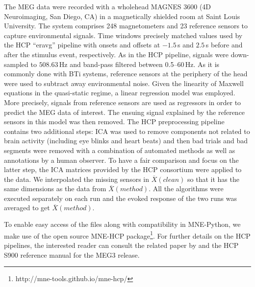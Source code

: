 The MEG data were recorded with a wholehead MAGNES 3600 (4D Neuroimaging, San Diego, CA) in a magnetically shielded room at Saint Louis University. The system comprises 248 magnetometers and 23 reference sensors to capture environmental signals. Time windows precisely matched values used by the HCP ``eravg'' pipeline with onsets and offsets at $-1.5$\,s and $2.5$\,s before and after the stimulus event, respectively. As in the HCP pipeline, signals were down-sampled to $508.63$\,Hz and band-pass filtered between 0.5--60\,Hz. As it is commonly done with BTi systems, reference sensors at the periphery of the head were used to subtract away environmental noise. Given the linearity of Maxwell equations in the quasi-static regime, a linear regression model was employed. More precisely, signals from reference sensors are used as regressors in order to predict the MEG data of interest. The ensuing signal explained by the reference sensors in this model was then removed. The HCP preprocessing pipeline contains two additional steps: ICA was used to remove components not related to brain activity (including eye blinks and heart beats) and then bad trials and bad segments were removed with a combination of automated methods as well as annotations by a human observer. To have a fair comparison and focus on the latter step, the ICA matrices provided by the HCP consortium were applied to the data. We interpolated the missing sensors in $\overbar{X}(clean)$ so that it has the same dimensions as the data from $\overbar{X}(method)$. All the algorithms were executed separately on each run and the evoked response of the two runs was averaged to get $\overbar{X}(method)$.

To enable easy access of the files along with compatibility in MNE-Python, we make use of the open source MNE-HCP package\footnote{http://mne-tools.github.io/mne-hcp/}. For further details on the HCP pipelines, the interested reader can consult the related paper by \citet{larson2013adding} and the HCP S900 reference manual for the MEG3 release.

